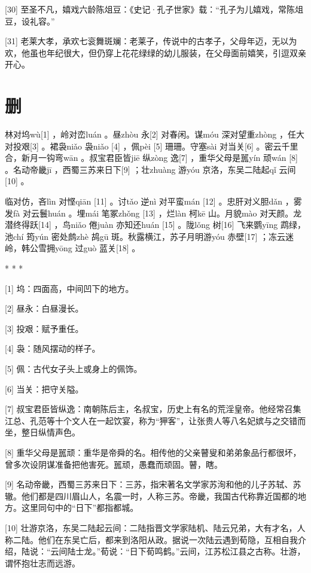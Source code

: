 \documentclass[12pt,UTF8]{ctexbook}
\begin{document}
[30] 至圣不凡，嬉戏六龄陈俎豆：《史记·孔子世家》载：“孔子为儿嬉戏，常陈俎豆，设礼容。”

[31] 老莱大孝，承欢七衮舞斑斓：老莱子，传说中的古孝子，父母年迈，无以为欢，他虽也年纪很大，但仍穿上花花绿绿的幼儿服装，在父母面前嬉笑，引逗双亲开心。





\chapter{删}


林对坞wù[1] ，岭对峦luán 。昼zhòu 永[2] 对春闲。谋móu 深对望重zhòng ，任大对投艰[3] 。裙袅niǎo 袅niǎo [4] ，佩pèi [5] 珊珊。守塞sài 对当关[6] 。密云千里合，新月一钩弯wān 。叔宝君臣皆jiē 纵zòng 逸[7] ，重华父母是嚚yín 顽wán [8] 。名动帝畿jī ，西蜀三苏来日下[9] ；壮zhuàng 游yóu 京洛，东吴二陆起qǐ 云间[10] 。

临对仿，吝lìn 对悭qiān [11] 。讨tǎo 逆nì 对平蛮mán [12] 。忠肝对义胆dǎn ，雾发fà 对云鬟huán 。埋mái 笔冢zhǒng [13] ，烂làn 柯kē 山。月貌mào 对天颜。龙潜终得跃[14] ，鸟niǎo 倦juàn 亦知还huán [15] 。陇lǒng 树[16] 飞来鹦yīng 鹉绿，池chí 筠yún 密处鹧zhè 鸪gū 斑。秋露横江，苏子月明游yóu 赤壁[17] ；冻云迷岭，韩公雪拥yōng 过guò 蓝关[18] 。



* * *



[1] 坞：四面高，中间凹下的地方。

[2] 昼永：白昼漫长。

[3] 投艰：赋予重任。

[4] 袅：随风摆动的样子。

[5] 佩：古代女子头上或身上的佩饰。

[6] 当关：把守关隘。

[7] 叔宝君臣皆纵逸：南朝陈后主，名叔宝，历史上有名的荒淫皇帝。他经常召集江总、孔范等十个文人在一起饮宴，称为“狎客”，让张贵人等八名妃嫔与之交错而坐，整日纵情声色。

[8] 重华父母是嚚顽：重华是帝舜的名。相传他的父亲瞽叟和弟弟象品行都很坏，曾多次设阴谋准备把他害死。嚚顽，愚蠢而顽固。瞽，瞎。

[9] 名动帝畿，西蜀三苏来日下：三苏，指宋著名文学家苏洵和他的儿子苏轼、苏辙。他们都是四川眉山人，名震一时，人称三苏。帝畿，我国古代称靠近国都的地方。这里同句中的“日下”都指都城。

[10] 壮游京洛，东吴二陆起云间：二陆指晋文学家陆机、陆云兄弟，大有才名，人称二陆。他们在东吴亡后，都来到洛阳从政。据说一次陆云遇到荀隐，互相自我介绍，陆说：“云间陆士龙。”荀说：“日下荀鸣鹤。”云间，江苏松江县之古称。壮游，谓怀抱壮志而远游。
\end{document}
